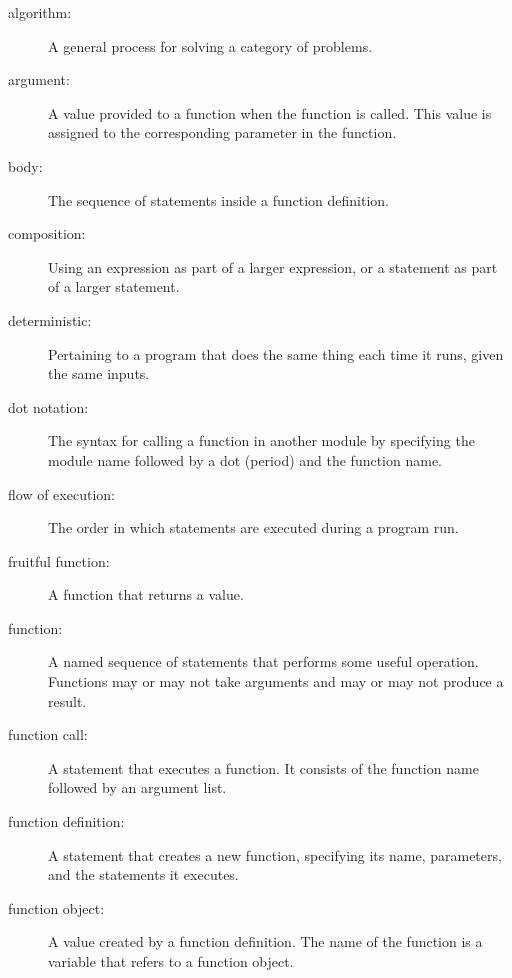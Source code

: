 \begin{description}

\item[algorithm:]  A general process for solving a category of
problems.

\item[argument:]  A value provided to a function when the function is called.
This value is assigned to the corresponding parameter in the function.

\item[body:] The sequence of statements inside a function definition.

\item[composition:] Using an expression as part of a larger expression,
or a statement as part of a larger statement.

\item[deterministic:] Pertaining to a program that does the same
thing each time it runs, given the same inputs.

\item[dot notation:]  The syntax for calling a function in another
module by specifying the module name followed by a dot (period) and
the function name.

\item[flow of execution:]  The order in which statements are executed during
a program run.

\item[fruitful function:] A function that returns a value.

\item[function:] A named sequence of statements that performs some
useful operation.  Functions may or may not take arguments and may or
may not produce a result.

\item[function call:] A statement that executes a function. It
consists of the function name followed by an argument list.

\item[function definition:]  A statement that creates a new function,
specifying its name, parameters, and the statements it executes.

\item[function object:]  A value created by a function definition.
The name of the function is a variable that refers to a function
object.


\end{description}
